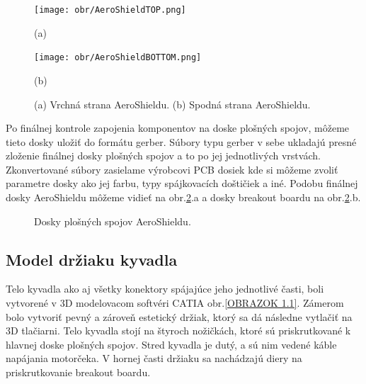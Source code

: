 \begin{figure}[!tbh]
	\centering
	\texttt{[image: obr/AeroShieldTOP.png]}
	
	(a)
	
	\texttt{[image: obr/AeroShieldBOTTOM.png]}
	
	(b)
	
	\caption{(a) Vrchná strana AeroShieldu. (b) Spodná strana AeroShieldu.}
	\label{OBRAZOK 2.4}
\end{figure}



Po finálnej kontrole zapojenia komponentov na doske plošných spojov, môžeme tieto dosky uložiť do formátu gerber. Súbory typu gerber v sebe ukladajú presné zloženie finálnej dosky plošných spojov a to po jej jednotlivých vrstvách. Zkonvertované súbory zasielame výrobcovi PCB dosiek kde si môžeme zvoliť parametre dosky ako jej farbu, typy spájkovacích doštičiek a iné. Podobu finálnej dosky AeroShieldu môžeme vidieť na obr.\ref{OBRAZOK 2.7}.a a dosky breakout boardu na obr.\ref{OBRAZOK 2.7}.b.


\begin{figure}
	\hfill
	\hfill
	\hfill
	\caption{Dosky plošných spojov AeroShieldu.}\label{OBRAZOK 2.7}
\end{figure}

\subsection{Model držiaku kyvadla}

Telo kyvadla ako aj všetky konektory spájajúce jeho jednotlivé časti, boli vytvorené v 3D modelovacom softvéri CATIA obr.\ref{OBRAZOK 1.1}. Zámerom bolo vytvoriť pevný a zároveň estetický držiak, ktorý sa dá následne vytlačiť na 3D tlačiarni. Telo kyvadla stojí na štyroch nožičkách, ktoré sú priskrutkované k hlavnej doske plošných spojov. Stred kyvadla je dutý, a sú nim vedené káble napájania motorčeka. V hornej časti držiaku sa nachádzajú diery na priskrutkovanie breakout boardu. 

